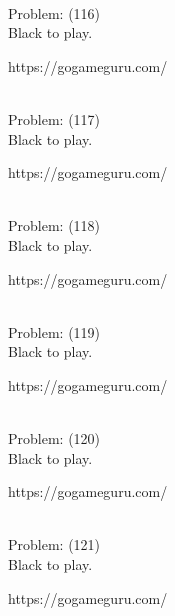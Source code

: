 \documentclass[11pt]{article}
\begin{document}
\begin{minipage}[t]{0.5\textwidth}
  {\centering
  
\\
Problem: (116)\\
Black to play.

https://gogameguru.com/\\
  }
\end{minipage}
\begin{minipage}[t]{0.5\textwidth}
  {\centering
  
\\
Problem: (117)\\
Black to play.

https://gogameguru.com/\\
  }
\end{minipage}
\begin{minipage}[t]{0.5\textwidth}
  {\centering
  
\\
Problem: (118)\\
Black to play.

https://gogameguru.com/\\
  }
\end{minipage}
\begin{minipage}[t]{0.5\textwidth}
  {\centering
  
\\
Problem: (119)\\
Black to play.

https://gogameguru.com/\\
  }
\end{minipage}
\begin{minipage}[t]{0.5\textwidth}
  {\centering
  
\\
Problem: (120)\\
Black to play.

https://gogameguru.com/\\
  }
\end{minipage}
\begin{minipage}[t]{0.5\textwidth}
  {\centering
  
\\
Problem: (121)\\
Black to play.

https://gogameguru.com/\\
  }
\end{minipage}
\end{document}
